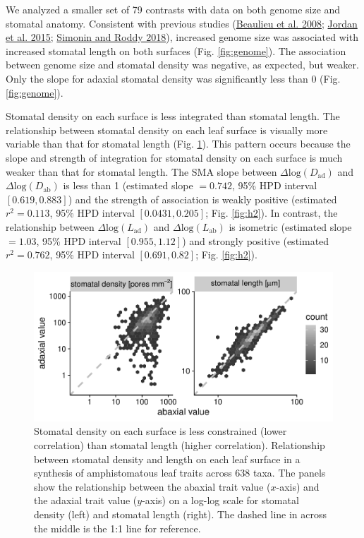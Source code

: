 \documentclass[
  12pt,
]{article}
\begin{document}
We analyzed a smaller set of 79 contrasts with data on both genome size and stomatal anatomy. Consistent with previous studies (\protect\hyperlink{ref-beaulieu_genome_2008}{Beaulieu et al. 2008}; \protect\hyperlink{ref-jordan_environmental_2015}{Jordan et al. 2015}; \protect\hyperlink{ref-simonin_genome_2018}{Simonin and Roddy 2018}), increased genome size was associated with increased stomatal length on both surfaces (Fig. \ref{fig:genome}). The association between genome size and stomatal density was negative, as expected, but weaker. Only the slope for adaxial stomatal density was significantly less than 0 (Fig. \ref{fig:genome}).

Stomatal density on each surface is less integrated than stomatal length. The relationship between stomatal density on each leaf surface is visually more variable than that for stomatal length (Fig. \ref{fig:h2_raw}). This pattern occurs because the slope and strength of integration for stomatal density on each surface is much weaker than that for stomatal length. The SMA slope between \(\Delta \text{log}(D_\text{ad})\) and \(\Delta \text{log}(D_\text{ab})\) is less than 1 (estimated slope \(= 0.742\), 95\% HPD interval \([0.619,0.883]\)) and the strength of association is weakly positive (estimated \(r^2 = 0.113\), 95\% HPD interval \([0.0431,0.205]\); Fig. \ref{fig:h2}). In contrast, the relationship between \(\Delta \text{log}(L_\text{ad})\) and \(\Delta \text{log}(L_\text{ab})\) is isometric (estimated slope \(= 1.03\), 95\% HPD interval \([0.955,1.12]\)) and strongly positive (estimated \(r^2 = 0.762\), 95\% HPD interval \([0.691,0.82]\); Fig. \ref{fig:h2}).

\begin{figure}[ht]
\includegraphics[width=\textwidth]{../figures/h2-raw.pdf}
\caption{Stomatal density on each surface is less constrained (lower correlation) than stomatal length (higher correlation). Relationship between stomatal density and length on each leaf surface in a synthesis of amphistomatous leaf traits across 638 taxa. The panels show the relationship between the abaxial trait value ($x$-axis) and the adaxial trait value ($y$-axis) on a log-log scale for stomatal density (left) and stomatal length (right). The dashed line in across the middle is the 1:1 line for reference.}
\label{fig:h2_raw}
\end{figure}
\end{document}
